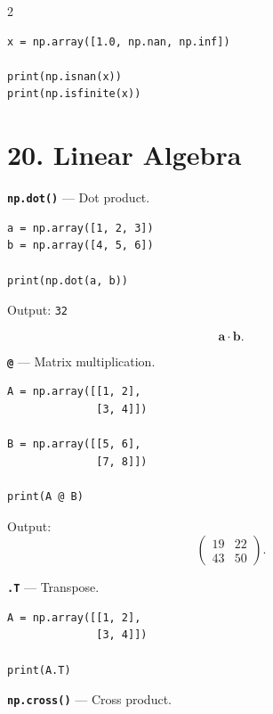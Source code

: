 \documentclass[10pt,a4paper]{article}
\begin{document}
\begin{multicols}{2}
\begin{card}
\begin{lstlisting}[style=pythonstyle]
x = np.array([1.0, np.nan, np.inf])

print(np.isnan(x))
print(np.isfinite(x))
\end{lstlisting}
\end{card}

\section*{20. Linear Algebra}

\begin{card}
\textbf{\texttt{np.dot()}} --- Dot product.

\begin{lstlisting}[style=pythonstyle]
a = np.array([1, 2, 3])
b = np.array([4, 5, 6])

print(np.dot(a, b))
\end{lstlisting}

Output:
\texttt{32}

\[
\mathbf a\cdot\mathbf b.
\]
\end{card}

\begin{card}
\textbf{\texttt{@}} --- Matrix multiplication.

\begin{lstlisting}[style=pythonstyle]
A = np.array([[1, 2],
              [3, 4]])

B = np.array([[5, 6],
              [7, 8]])

print(A @ B)
\end{lstlisting}

Output:
\[
\begin{pmatrix}
19 & 22\\
43 & 50
\end{pmatrix}.
\]
\end{card}

\begin{card}
\textbf{\texttt{.T}} --- Transpose.

\begin{lstlisting}[style=pythonstyle]
A = np.array([[1, 2],
              [3, 4]])

print(A.T)
\end{lstlisting}
\end{card}

\begin{card}
\textbf{\texttt{np.cross()}} --- Cross product.


\end{card}
\end{multicols}
\end{document}
